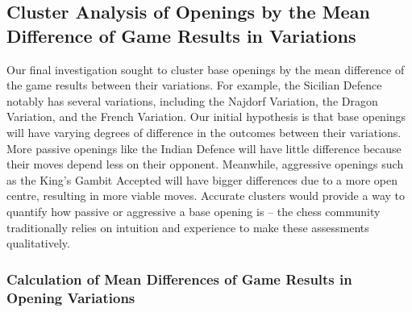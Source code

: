 \documentclass[a4paper, 11pt]{article}
\begin{document}
\subsection{Cluster Analysis of Openings by the Mean Difference of Game Results in Variations}
Our final investigation sought to cluster base openings by the mean difference of the game results between their variations. For example, the Sicilian Defence notably has several variations, including the Najdorf Variation, the Dragon Variation, and the French Variation. Our initial hypothesis is that base openings will have varying degrees of difference in the outcomes between their variations. More passive openings like the Indian Defence will have little difference because their moves depend less on their opponent. Meanwhile, aggressive openings such as the King's Gambit Accepted will have bigger differences due to a more open centre, resulting in more viable moves. Accurate clusters would provide a way to quantify how passive or aggressive a base opening is -- the chess community traditionally relies on intuition and experience to make these assessments qualitatively. 

\subsubsection{Calculation of Mean Differences of Game Results in Opening Variations}
\end{document}
